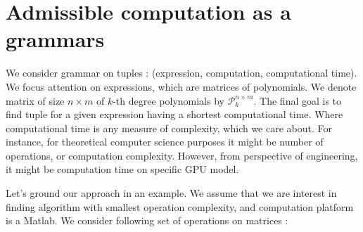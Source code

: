 \documentclass{article}
\begin{document}


\section{Admissible computation as a grammars}\label{sec:grammars}

We consider grammar on tuples : (expression, computation, computational time).
We focus attention on expressions, which are matrices of polynomials. We denote
matrix of size $n \times m$ of $k$-th degree polynomials by $\mathcal{P}^{n
\times m}_k$.  The final goal is to find tuple for a given expression having
a shortest computational time. Where computational time is any measure of
complexity, which we care about. For instance, for theoretical computer science
purposes it might be number of operations, or computation complexity. However,
from perspective of engineering, it might be computation time on specific GPU
model. 


Let's ground our approach in an example. We assume that we are interest in
finding algorithm with smallest operation complexity, and computation platform
is a Matlab.  We consider following set of operations on matrices : 
\end{document}
